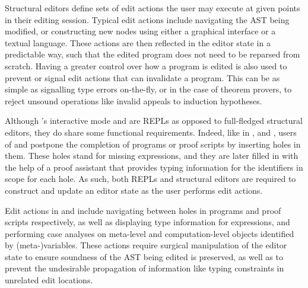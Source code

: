 
Structural editors define sets of edit actions the user may execute at given points in their editing session.
Typical edit actions include navigating the \ac{AST} being modified, or constructing new nodes using either a graphical interface or a textual language.
These actions are then reflected in the editor state in a predictable way, such that the edited program does not need to be reparsed from scratch.
Having a greater control over how a program is edited is also used to prevent or signal edit actions that can invalidate a program.
This can be as simple as signalling type errors on-the-fly, or in the case of theorem provers, to reject unsound operations like invalid appeals to induction hypotheses.


Although \Beluga's interactive mode and \Harpoon are \acp{REPL} as opposed to full-fledged structural editors, they do share some functional requirements.
Indeed, like in \Isabelle, \Hazel and \Coq, users of \Beluga and \Harpoon postpone the completion of programs or proof scripts by inserting holes in them.
These holes stand for missing expressions, and they are later filled in with the help of a proof assistant that provides typing information for the identifiers in scope for each hole.
As such, both \acp{REPL} and structural editors are required to construct and update an editor state as the user performs edit actions.


Edit actions in \Beluga and \Harpoon include navigating between holes in programs and proof scripts respectively, as well as displaying type information for expressions, and performing case analyses on meta-level and computation-level objects identified by (meta-)variables.
These actions require surgical manipulation of the editor state to ensure soundness of the \ac{AST} being edited is preserved, as well as to prevent the undesirable propagation of information like typing constraints in unrelated edit locations.


